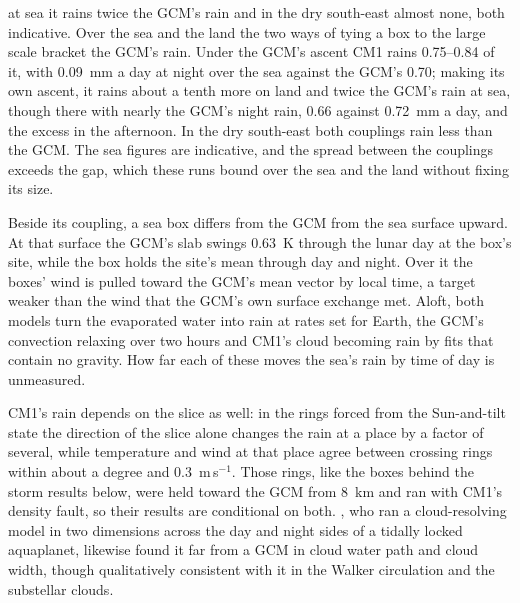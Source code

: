 at sea it rains twice the GCM's rain and in the dry south-east almost none, both indicative. Over the sea and the land the two ways of tying a box to the large scale bracket the GCM's rain. Under the GCM's
ascent CM1 rains 0.75--0.84 of it, with
0.09~mm a day at night over the sea against the GCM's 0.70; making its own ascent, it rains about a tenth more on land and twice the GCM's rain at sea, though there with nearly the GCM's night
rain, 0.66 against 0.72~mm a day, and the excess in the afternoon. In the dry south-east both couplings rain less
than the GCM. The sea figures are indicative, and the spread between the couplings exceeds
the gap, which these runs bound over the sea and the land without fixing its size.

Beside its coupling, a sea box differs from the GCM from the sea surface upward. At that surface the
GCM's slab swings 0.63~K through the lunar day at the box's site, while the box holds the site's mean through day
and night. Over it the boxes' wind is pulled toward the GCM's mean vector by local time, a target weaker than the
wind that the GCM's own surface exchange met. Aloft, both models turn the evaporated water into rain at rates set for Earth, the GCM's convection relaxing
over two hours and CM1's cloud becoming rain by fits that contain no gravity. How far each of these
moves the sea's rain by time of day is unmeasured.

CM1's rain depends on the slice as well: in the rings forced from the Sun-and-tilt state the direction of the slice
alone changes the rain at a place by a factor of several, while temperature and wind at that place agree between
crossing rings within about a degree and 0.3~m\,s$^{-1}$. Those rings, like the boxes behind the storm
results below, were held toward the GCM from 8~km and ran with CM1's density fault, so their results are
conditional on both. \textcite{song2022idealized}, who ran a cloud-resolving model in two dimensions across the day
and night sides of a tidally locked aquaplanet, likewise found it far from a GCM in cloud water path and cloud width,
though qualitatively consistent with it in the Walker circulation and the substellar clouds.

